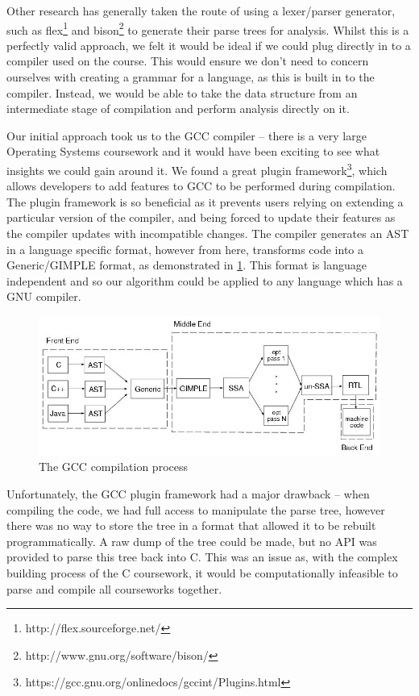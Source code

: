 Other research has generally taken the route of using a lexer/parser generator,
such as flex\footnote{http://flex.sourceforge.net/} and 
bison\footnote{http://www.gnu.org/software/bison/} to generate their parse trees
for analysis. Whilst this is a perfectly valid approach, we felt it would be
ideal if we could plug directly in to a compiler used on the course. This
would ensure we don't need to concern ourselves with creating a grammar for a
language, as this is built in to the compiler. Instead, we would be able to
take the data structure from an intermediate stage of compilation and perform
analysis directly on it.

Our initial approach took us to the GCC compiler -- there is a very large
Operating Systems coursework and it would have been exciting to see what insights
we could gain around it. We found a great plugin 
framework\footnote{https://gcc.gnu.org/onlinedocs/gccint/Plugins.html}, which
allows developers to add features to GCC to be performed during compilation. The
plugin framework is so beneficial as it prevents users relying on extending
a particular version of the compiler, and being forced to update their features
as the compiler updates with incompatible changes. The compiler generates an
AST in a language specific format, however from here, transforms code into a
Generic/GIMPLE format, as demonstrated in \cref{fig:GCCFlow}. This format is
language independent and so our algorithm could be applied to any language
which has a GNU compiler.

\begin{figure}[H]
	\centering
		\includegraphics[width=\textwidth]{Figures/GCCFlow}\footnotemark{}
	\caption{The GCC compilation process}
	\label{fig:GCCFlow}
	
\end{figure}

Unfortunately, the GCC plugin framework had a major drawback -- when compiling
the code, we had full access to manipulate the parse tree, however there was
no way to store the tree in a format that allowed it to be rebuilt 
programmatically. A raw dump of the tree could be made, but no API was 
provided to parse this tree back into C. This was an issue as, with the complex
building process of the C coursework, it would be computationally infeasible
to parse and compile all courseworks together.

